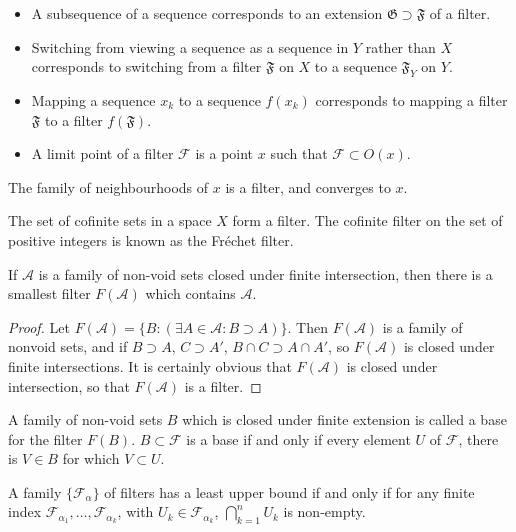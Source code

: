 \begin{itemize}
    \item A subsequence of a sequence corresponds to an extension $\mathfrak{G} \supset \mathfrak{F}$ of a filter.
    \item Switching from viewing a sequence as a sequence in $Y$ rather than $X$ corresponds to switching from a filter $\mathfrak{F}$ on $X$ to a sequence $\mathfrak{F}_Y$ on $Y$.
    \item Mapping a sequence $x_k$ to a sequence $f(x_k)$ corresponds to mapping a filter $\mathfrak{F}$ to a filter $f(\mathfrak{F})$.
    \item A limit point of a filter $\mathcal{F}$ is a point $x$ such that $\mathcal{F} \subset O(x)$.
\end{itemize}

\begin{example}
    The family of neighbourhoods of $x$ is a filter, and converges to $x$.
\end{example}

\begin{example}
    The set of cofinite sets in a space $X$ form a filter. The cofinite filter on the set of positive integers is known as the Fr\'{e}chet filter.
\end{example}

\begin{lemma}
    If $\mathcal{A}$ is a family of non-void sets closed under finite intersection, then there is a smallest filter $F(\mathcal{A})$ which contains $\mathcal{A}$.
\end{lemma}
\begin{proof}
    Let $F(\mathcal{A}) = \{ B : (\exists A \in \mathcal{A}: B \supset A) \}$. Then $F(\mathcal{A})$ is a family of nonvoid sets, and if $B \supset A$, $C \supset A'$, $B \cap C \supset A \cap A'$, so $F(\mathcal{A})$ is closed under finite intersections. It is certainly obvious that $F(\mathcal{A})$ is closed under intersection, so that $F(\mathcal{A})$ is a filter.
\end{proof}

A family of non-void sets $B$ which is closed under finite extension is called a base for the filter $F(B)$. $B \subset \mathcal{F}$ is a base if and only if every element $U$ of $\mathcal{F}$, there is $V \in B$ for which $V \subset U$.

\begin{corollary}
    A family $\{ \mathcal{F}_\alpha \}$ of filters has a least upper bound if and only if for any finite index $\mathcal{F}_{\alpha_1}, \dots, \mathcal{F}_{\alpha_k}$, with $U_k \in \mathcal{F}_{\alpha_k}$, $\bigcap_{k = 1}^n U_k$ is non-empty.
\end{corollary}


